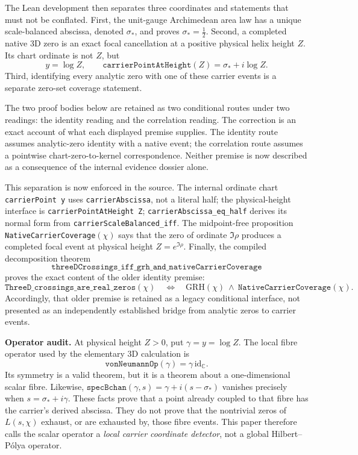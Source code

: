 The Lean development then separates three coordinates and statements that
must not be conflated.  First, the unit-gauge Archimedean area law has a unique
scale-balanced abscissa, denoted \(\sigma_*\), and proves
\(\sigma_*=\tfrac12\).  Second, a completed native 3D zero is an exact focal
cancellation at a positive physical helix height $Z$.  Its chart ordinate is
not $Z$, but
\[
 y=\log Z,
 \qquad
 \texttt{carrierPointAtHeight}(Z)=\sigma_*+i\log Z.
\]
Third, identifying every analytic zero with one of these carrier events is a
separate zero-set coverage statement.

The two proof bodies below are retained as two conditional routes under two
readings: the identity reading and the correlation reading.  The correction is
an exact account of what each displayed premise supplies.  The identity route
assumes analytic-zero identity with a native event; the correlation route
assumes a pointwise chart-zero-to-kernel correspondence.  Neither premise is
now described as a consequence of the internal evidence dossier alone.

This separation is now enforced in the source.  The internal ordinate chart
\texttt{carrierPoint y} uses \texttt{carrierAbscissa}, not a literal half;
the physical-height interface is \texttt{carrierPointAtHeight Z};
\texttt{carrierAbscissa\_eq\_half} derives its normal form from
\texttt{carrierScaleBalanced\_iff}.  The midpoint-free proposition
\texttt{NativeCarrierCoverage}\((\chi)\) says that the zero of ordinate
\(\Im\rho\) produces a completed focal event at physical height
\(Z=e^{\Im\rho}\).  Finally, the compiled decomposition theorem
\[
\texttt{threeDCrossings\_iff\_grh\_and\_nativeCarrierCoverage}
\]
proves the exact content of the older identity premise:
\[
 \texttt{ThreeD\_crossings\_are\_real\_zeros}(\chi)
 \quad\Longleftrightarrow\quad
 \mathrm{GRH}(\chi)\ \wedge\
 \texttt{NativeCarrierCoverage}(\chi).
\]
Accordingly, that older premise is retained as a legacy conditional interface,
not presented as an independently established bridge from analytic zeros to
carrier events.

\medskip
\noindent\textbf{Operator audit.}  At physical height $Z>0$, put
\(\gamma=y=\log Z\).  The local fibre operator used by the elementary 3D
calculation is
\[
 \texttt{vonNeumannOp}(\gamma)=\gamma\,\mathrm{id}_{\mathbb C}.
\]
Its symmetry is a valid theorem, but it is a theorem about a one-dimensional
scalar fibre.  Likewise,
\(\texttt{specBchan}(\gamma,s)=\gamma+i(s-\sigma_*)\) vanishes precisely when
\(s=\sigma_*+i\gamma\).  These facts prove that a point already coupled to
that fibre has the carrier's derived abscissa.  They do not prove that the
nontrivial zeros of \(L(s,\chi)\) exhaust, or are exhausted by, those fibre
events.  This paper therefore calls the scalar operator a \emph{local carrier
coordinate detector}, not a global Hilbert--P\'olya operator.

